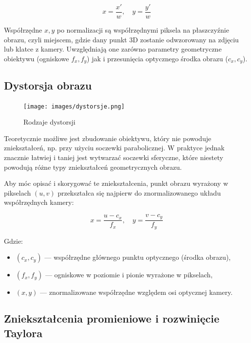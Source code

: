 \documentclass[magisterska]{pracadypl}
\begin{document}
\[
x = \frac{x'}{w}, \quad y = \frac{y'}{w}
\]

Współrzędne \( x, y \) po normalizacji są współrzędnymi piksela na płaszczyźnie obrazu, czyli miejscem, gdzie dany punkt 3D zostanie odwzorowany na zdjęciu lub klatce z kamery. Uwzględniają one zarówno parametry geometryczne obiektywu (ogniskowe \( f_x, f_y \)) jak i przesunięcia optycznego środka obrazu (\( c_x, c_y \)).

\subsection{Dystorsja obrazu}

\begin{figure}[H]  %
    \centering  %
    \texttt{[image: images/dystorsje.png]}  %
    \captionsetup{font=footnotesize}
    \caption[Rodzaje dystorsji. https://beafoto.pl/dystorsja]{Rodzaje dystorsji}
    \label{fig:rpi}  %
\end{figure}

Teoretycznie możliwe jest zbudowanie obiektywu, który nie powoduje zniekształceń, np. przy użyciu soczewki parabolicznej. W praktyce jednak znacznie łatwiej i taniej jest wytwarzać soczewki sferyczne, które niestety powodują różne typy zniekształceń geometrycznych obrazu.

Aby móc opisać i skorygować te zniekształcenia, punkt obrazu wyrażony w pikselach \( (u, v) \) przekształca się najpierw do znormalizowanego układu współrzędnych kamery:

\[
x = \frac{u - c_x}{f_x}, \quad y = \frac{v - c_y}{f_y}
\]

Gdzie:
\begin{itemize}
    \item \( (c_x, c_y) \) — współrzędne głównego punktu optycznego (środka obrazu),
    \item \( (f_x, f_y) \) — ogniskowe w poziomie i pionie wyrażone w pikselach,
    \item \( (x, y) \) — znormalizowane współrzędne względem osi optycznej kamery.
\end{itemize}

\subsection*{Zniekształcenia promieniowe i rozwinięcie Taylora}
\end{document}
